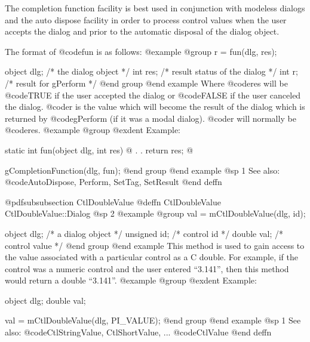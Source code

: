 The completion function facility is best used in conjunction with
modeless dialogs and the auto dispose facility in order to process
control values when the user accepts the dialog and prior to the
automatic disposal of the dialog object.

The format of @code{fun} is as follows:
@example
@group
r = fun(dlg, res);

object  dlg;    /*  the dialog object  */
int     res;    /*  result status of the dialog  */
int     r;      /*  result for gPerform  */
@end group
@end example
Where @code{res} will be @code{TRUE} if the user accepted the dialog or
@code{FALSE} if the user canceled the dialog.  @code{r} is the value
which will become the result of the dialog which is returned by @code{gPerform}
(if it was a modal dialog).  @code{r} will normally be @code{res}.
@example
@group
@exdent Example:

static  int     fun(object dlg, int res)
@{
        .
        .
        return res;
@}

        gCompletionFunction(dlg, fun);
@end group
@end example
@sp 1
See also:  @code{AutoDispose, Perform, SetTag, SetResult}
@end deffn














@pdfsubsubsection {CtlDoubleValue}
@deffn {CtlDoubleValue} CtlDoubleValue::Dialog
@sp 2
@example
@group
val = mCtlDoubleValue(dlg, id);

object  dlg;    /*  a dialog object  */
unsigned id;    /*  control id       */
double  val;    /*  control value    */
@end group
@end example
This method is used to gain access to the value associated with a
particular control as a C double.  For example, if the control
was a numeric control and the user entered ``3.141'', then this method
would return a double ``3.141''.
@example
@group
@exdent Example:

object  dlg;
double  val;

val = mCtlDoubleValue(dlg, PI_VALUE);
@end group
@end example
@sp 1
See also:  @code{CtlStringValue, CtlShortValue, ...}
        @code{CtlValue}
@end deffn

















